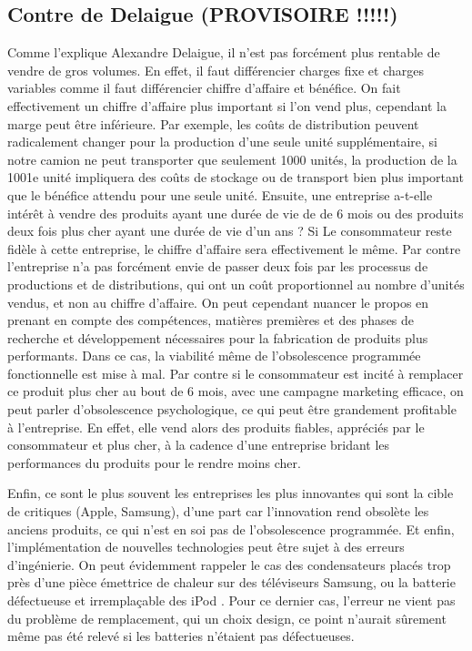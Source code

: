 \subsection{Contre de Delaigue (PROVISOIRE !!!!!)}


Comme l’explique Alexandre Delaigue, il n’est pas forcément plus rentable de vendre de gros volumes. En effet, il faut différencier charges fixe et charges variables comme il faut différencier chiffre d’affaire et bénéfice. On fait effectivement un chiffre d’affaire plus important si l’on vend plus, cependant la marge peut être inférieure. Par exemple,  les coûts de distribution peuvent radicalement changer pour la production d’une seule unité supplémentaire, si notre camion ne peut transporter que seulement  1000 unités,  la production de la 1001e unité impliquera des coûts de stockage ou de transport bien plus important que le bénéfice attendu pour une seule unité. Ensuite, une entreprise a-t-elle intérêt à vendre des produits ayant une durée de vie de de 6 mois ou des produits deux fois plus cher ayant une durée de vie d’un ans ? Si Le consommateur reste fidèle à cette entreprise, le chiffre d’affaire sera effectivement le même. Par contre l’entreprise n’a pas forcément envie de passer deux fois par les processus de productions et de distributions, qui ont un coût proportionnel au nombre d’unités vendus, et non au chiffre d’affaire. On peut cependant nuancer le propos en prenant en compte des compétences, matières premières  et des phases de recherche et développement nécessaires pour la fabrication de produits plus performants. Dans ce cas, la viabilité même de l’obsolescence programmée fonctionnelle est mise à mal. Par contre si le consommateur est incité à remplacer ce produit plus cher au bout de 6 mois, avec une campagne marketing efficace, on peut parler d’obsolescence psychologique, ce qui peut être grandement  profitable à l’entreprise. En effet, elle vend alors des produits fiables, appréciés par le consommateur et plus cher, à la cadence d’une entreprise bridant les performances du produits pour le rendre moins cher.

Enfin, ce sont le plus souvent les entreprises les plus innovantes qui sont la cible de critiques (Apple, Samsung), d’une part car l’innovation rend obsolète les anciens produits, ce qui n’est en soi pas de l’obsolescence programmée. Et enfin, l’implémentation de nouvelles technologies peut être sujet à des erreurs d’ingénierie. On peut évidemment rappeler le cas des condensateurs placés trop près d’une pièce émettrice de  chaleur sur des téléviseurs Samsung, ou la batterie défectueuse et irremplaçable des iPod . Pour ce dernier cas, l’erreur ne vient pas du problème de remplacement, qui un choix design, ce point n’aurait sûrement même pas été relevé si les batteries n’étaient pas défectueuses.
